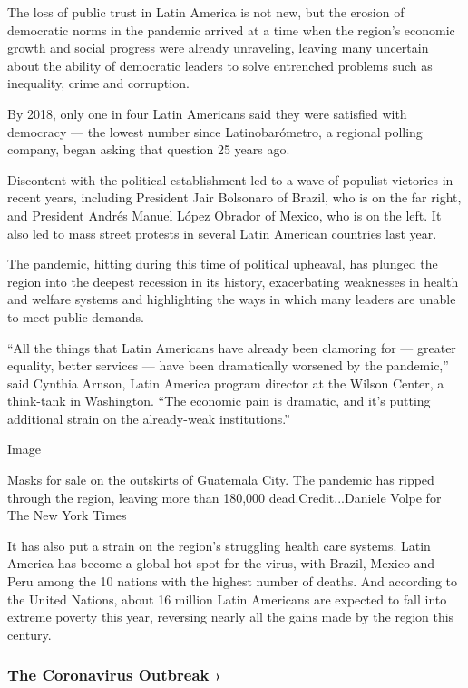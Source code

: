 The loss of public trust in Latin America is not new, but the erosion of
democratic norms in the pandemic arrived at a time when the region's
economic growth and social progress were already unraveling, leaving
many uncertain about the ability of democratic leaders to solve
entrenched problems such as inequality, crime and corruption.

By 2018, only one in four Latin Americans said they were satisfied with
democracy --- the lowest number since Latinobarómetro, a regional
polling company, began asking that question 25 years ago.

Discontent with the political establishment led to a wave of populist
victories in recent years, including President Jair Bolsonaro of Brazil,
who is on the far right, and President Andrés Manuel López Obrador of
Mexico, who is on the left. It also led to mass street protests in
several Latin American countries last year.

The pandemic, hitting during this time of political upheaval, has
plunged the region into the deepest recession in its history,
exacerbating weaknesses in health and welfare systems and highlighting
the ways in which many leaders are unable to meet public demands.

``All the things that Latin Americans have already been clamoring for
--- greater equality, better services --- have been dramatically
worsened by the pandemic,'' said Cynthia Arnson, Latin America program
director at the Wilson Center, a think-tank in Washington. ``The
economic pain is dramatic, and it's putting additional strain on the
already-weak institutions.''

Image

Masks for sale on the outskirts of Guatemala City. The pandemic has
ripped through the region, leaving more than 180,000
dead.Credit...Daniele Volpe for The New York Times

It has also put a strain on the region's struggling health care systems.
Latin America has become a global hot spot for the virus, with Brazil,
Mexico and Peru among the 10 nations with the highest number of deaths.
And according to the United Nations, about 16 million Latin Americans
are expected to fall into extreme poverty this year, reversing nearly
all the gains made by the region this century.

\href{https://www.nytimes3xbfgragh.onion/news-event/coronavirus?action=click\&pgtype=Article\&state=default\&region=MAIN_CONTENT_3\&context=storylines_faq}{}

\hypertarget{the-coronavirus-outbreak-}{%
\subsubsection{The Coronavirus Outbreak
›}\label{the-coronavirus-outbreak-}}


